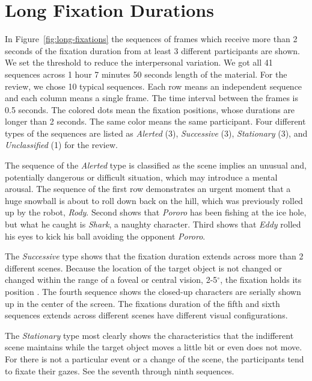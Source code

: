 \documentclass[oneside,master]{snueethesis}
\begin{document}
\section{Long Fixation Durations}
\label{subsec:Long-Fixation-Durations}

In Figure~\ref{fig:long-fixations} the sequences of frames which receive more than 2 seconds of the fixation duration from at least 3 different participants are shown. We set the threshold to reduce the interpersonal variation. We got all 41 sequences across 1 hour 7 minutes 50 seconds length of the material. For the review, we chose 10 typical sequences. Each row means an independent sequence and each column means a single frame. The time interval between the frames is 0.5 seconds. The colored dots mean the fixation positions, whose durations are longer than 2 seconds. The same color means the same participant. Four different types of the sequences are listed as \textit{Alerted} (3), \textit{Successive} (3), \textit{Stationary} (3), and \textit{Unclassified} (1) for the review.

The sequence of the \textit{Alerted} type is classified as the scene implies an unusual and, potentially dangerous or difficult situation, which may introduce a mental arousal. The sequence of the first row demonstrates an urgent moment that a huge snowball is about to roll down back on the hill, which was previously rolled up by the robot, \textit{Rody}. Second shows that \textit{Pororo} has been fishing at the ice hole, but what he caught is \textit{Shark}, a naughty character. Third shows that \textit{Eddy} rolled his eyes to kick his ball avoiding the opponent \textit{Pororo}.

The \textit{Successive} type shows that the fixation duration extends across more than 2 different scenes. Because the location of the target object is not changed or changed within the range of a foveal or central vision, 2-5$^{\circ}$, the fixation holds its position \cite{mcmorris2014acquisition}. The fourth sequence shows the closed-up characters are serially shown up in the center of the screen. The fixations duration of the fifth and sixth sequences extends across different scenes have different visual configurations.

The \textit{Stationary} type most clearly shows the characteristics that the indifferent scene maintains while the target object moves a little bit or even does not move. For there is not a particular event or a change of the scene, the participants tend to fixate their gazes. See the seventh through ninth sequences.
\end{document}

